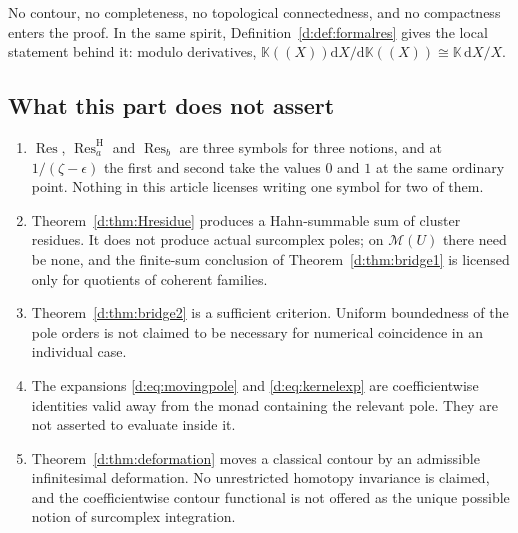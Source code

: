\documentclass[11pt,a4paper]{article}
\numberwithin{equation}{section}
\theoremstyle{definition}
\theoremstyle{remark}
\theoremstyle{plain}
\newcommand{\K}{\mathbb K}
\newcommand{\Mc}{\mathcal M}
\DeclareMathOperator{\Res}{Res}                 %
\newcommand{\ResH}[1]{\Res^{\mathrm H}_{#1}}    %
\newcommand{\Resat}[1]{\Res_{#1}}               %
\newcommand{\dd}{\mathrm d}
\begin{document}
No contour, no completeness, no topological connectedness, and no
compactness enters the proof.  In the same spirit,
Definition~\ref{d:def:formalres} gives the local statement behind it:
modulo derivatives, $\K((X))\dd X/\dd\K((X))\cong\K\,\dd X/X$.

\subsection{What this part does not assert}
\label{d:sub:residuescope}

\begin{enumerate}[label=(\alph*)]
\item $\Res$, $\ResH{a}$ and $\Resat{b}$ are three symbols for three
notions, and at $1/(\zeta-\epsilon)$ the first and second take the
values $0$ and $1$ at the same ordinary point.  Nothing in this article
licenses writing one symbol for two of them.
\item Theorem~\ref{d:thm:Hresidue} produces a Hahn-summable sum of
cluster residues.  It does not produce actual surcomplex poles; on
$\Mc(U)$ there need be none, and the finite-sum conclusion of
Theorem~\ref{d:thm:bridge1} is licensed only for quotients of coherent
families.
\item Theorem~\ref{d:thm:bridge2} is a sufficient criterion.  Uniform
boundedness of the pole orders is not claimed to be necessary for
numerical coincidence in an individual case.
\item The expansions \eqref{d:eq:movingpole} and
\eqref{d:eq:kernelexp} are coefficientwise identities valid away from
the monad containing the relevant pole.  They are not asserted to
evaluate inside it.
\item Theorem~\ref{d:thm:deformation} moves a classical contour by an
admissible infinitesimal deformation.  No unrestricted homotopy
invariance is claimed, and the coefficientwise contour functional is not
offered as the unique possible notion of surcomplex integration.
\end{enumerate}


\end{document}
